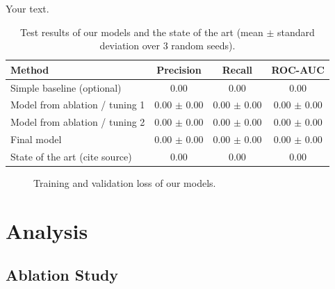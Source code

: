 \documentclass{article}
\begin{document}
Your text.

\begin{table}[t]
  \caption{Test results of our models and the state of the art (mean $\pm$ standard deviation over 3 random seeds).}
  \label{tab:results}
  \centering
  \begin{tabular}{lccc}
    \toprule
    Method & Precision & Recall & ROC-AUC \\
    \midrule
    Simple baseline (optional)     & 0.00 & 0.00 & 0.00 \\
    Model from ablation / tuning 1 & 0.00 $\pm$ 0.00 & 0.00 $\pm$ 0.00 & 0.00 $\pm$ 0.00 \\
    Model from ablation / tuning 2 & 0.00 $\pm$ 0.00 & 0.00 $\pm$ 0.00 & 0.00 $\pm$ 0.00 \\
    Final model                    & 0.00 $\pm$ 0.00 & 0.00 $\pm$ 0.00 & 0.00 $\pm$ 0.00 \\
    \midrule
    State of the art (cite source) & 0.00 & 0.00 & 0.00 \\
    \bottomrule
  \end{tabular}
\end{table}

\begin{figure}[t]
  \centering
  \caption{Training and validation loss of our models.}
  \label{fig:curves}
\end{figure}

\section{Analysis}

\subsection{Ablation Study}
\end{document}

